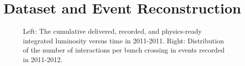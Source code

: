 \chapter{Dataset and Event Reconstruction}\label{ch:dataset-reconstruction}
\begin{figure}[htbp]
	\centering
	\hfill
	\hfill
	\hfill
	\caption{Left: The cumulative delivered, recorded, and physics-ready integrated luminosity versus time in 2011-2011. Right: Distribution of the number of interactions per bunch crossing in events recorded in 2011-2012.}
	
\end{figure}

